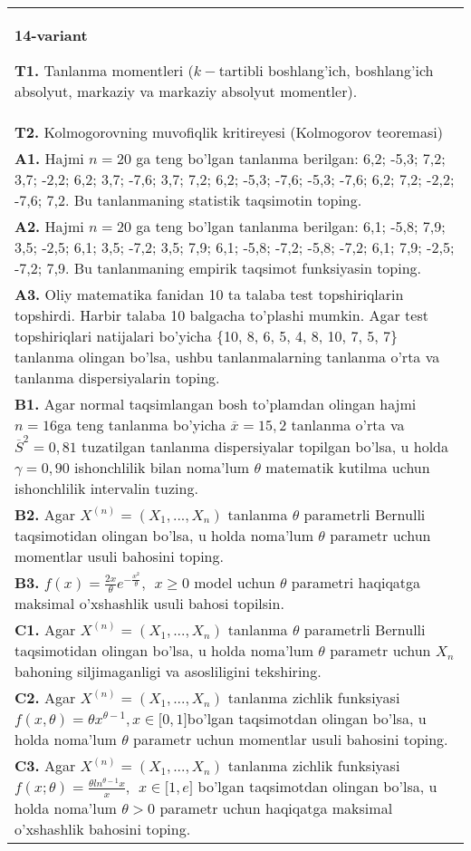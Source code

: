 \documentclass{article}
\begin{document}
\begin{tabular}{m{17cm}}
\textbf{14-variant}
\newline

\textbf{T1.} 
Tanlanma momentleri (\(k -\)tartibli boshlang'ich, boshlang'ich absolyut, markaziy va markaziy absolyut momentler).
\\
\textbf{T2.} 
Kolmogorovning muvofiqlik kritireyesi (Kolmogorov teoremasi)
\\
\textbf{A1.} 
Hajmi \(n = 20\) ga teng bo'lgan tanlanma berilgan: 6,2; -5,3; 7,2; 3,7; -2,2; 6,2; 3,7; -7,6; 3,7; 7,2; 6,2; -5,3; -7,6; -5,3; -7,6; 6,2; 7,2; -2,2; -7,6; 7,2. Bu tanlanmaning statistik taqsimotin toping.
\\
\textbf{A2.} 
Hajmi \(n = 20\) ga teng bo'lgan tanlanma berilgan: 6,1; -5,8; 7,9; 3,5; -2,5; 6,1; 3,5; -7,2; 3,5; 7,9; 6,1; -5,8; -7,2; -5,8; -7,2; 6,1; 7,9; -2,5; -7,2; 7,9. Bu tanlanmaning empirik taqsimot funksiyasin toping.
\\
\textbf{A3.} 
Oliy matematika fanidan 10 ta talaba test topshiriqlarin topshirdi. Harbir talaba 10 balgacha to'plashi mumkin. Agar test topshiriqlari natijalari bo'yicha \{10, 8, 6, 5, 4, 8, 10, 7, 5, 7\} tanlanma olingan bo'lsa, ushbu tanlanmalarning tanlanma o'rta va tanlanma dispersiyalarin toping.
\\
\textbf{B1.} 
Agar normal taqsimlangan bosh to'plamdan olingan hajmi \(n = 16\)ga teng tanlanma bo'yicha \(\overline{x} = 15,2\) tanlanma o'rta va \({\overline{S}}^{2} = 0,81\) tuzatilgan tanlanma dispersiyalar topilgan bo'lsa, u holda \(\gamma = 0,90\) ishonchlilik bilan noma'lum \(\theta\) matematik kutilma uchun ishonchlilik intervalin tuzing.
\\
\textbf{B2.} 
Agar \(X^{(n)} = \left( X_{1},...,X_{n} \right)\) tanlanma \(\theta\) parametrli Bernulli taqsimotidan olingan bo'lsa, u holda noma'lum \(\theta\) parametr uchun momentlar usuli bahosini toping.
\\
\textbf{B3.} 
\(f(x) = \frac{2x}{\theta}e^{- \frac{x^{2}}{\theta}},\ \ x \geq 0\) model uchun \(\theta\) parametri haqiqatga maksimal o'xshashlik usuli bahosi topilsin.
\\
\textbf{C1.} 
Agar \(X^{(n)} = \left( X_{1},...,X_{n} \right)\) tanlanma \(\theta\) parametrli Bernulli taqsimotidan olingan bo'lsa, u holda noma'lum \(\theta\) parametr uchun \(X_{n}\) bahoning siljimaganligi va asosliligini tekshiring.
\\
\textbf{C2.} 
Agar \(X^{(n)} = \left( X_{1},...,X_{n} \right)\) tanlanma zichlik funksiyasi\(f(x,\theta) = \theta x^{\theta - 1},x \in \lbrack 0,1\rbrack\)bo'lgan taqsimotdan olingan bo'lsa, u holda noma'lum \(\theta\) parametr uchun momentlar usuli bahosini toping.
\\
\textbf{C3.} 
Agar \(X^{(n)} = \left( X_{1},...,X_{n} \right)\) tanlanma zichlik funksiyasi \(f(x;\theta) = \frac{\theta ln^{\theta - 1}x}{x},\ \ x \in \lbrack 1,e\rbrack\) bo'lgan taqsimotdan olingan bo'lsa, u holda noma'lum \(\theta > 0\) parametr uchun haqiqatga maksimal o'xshashlik bahosini toping.
\\

\end{tabular}
\vspace{1cm}
\end{document}
